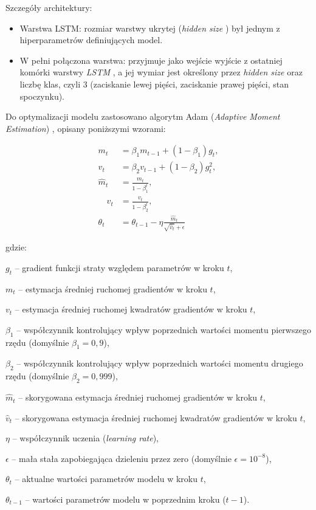 \documentclass[eeg_v4.tex]{subfiles}
\begin{document}
    Szczegóły architektury:
    \begin{itemize}
        \item Warstwa LSTM: rozmiar warstwy ukrytej (\textit{hidden size}
        ) był jednym z hiperparametrów definiujących model.
        \item W pełni połączona warstwa: przyjmuje jako wejście wyjście z ostatniej komórki warstwy \textit{LSTM}
        , a jej wymiar jest określony przez \textit{hidden size}
        oraz liczbę klas, czyli 3 (zaciskanie lewej pięści, zaciskanie prawej pięści, stan spoczynku).
    \end{itemize}

    Do optymalizacji modelu zastosowano algorytm Adam (\textit{Adaptive Moment Estimation}) \cite{pytorch2025adam}
    , opisany poniższymi wzorami:

    \[
        \begin{align*}
            m_t &= \beta_1 m_{t-1} + (1 - \beta_1) g_t, \\
            v_t &= \beta_2 v_{t-1} + (1 - \beta_2) g_t^2, \\
            \hat{m}_t &= \frac{m_t}{1 - \beta_1^t}, \\
            \quad \hat{v}_t &= \frac{v_t}{1 - \beta_2^t}, \\
            \theta_t &= \theta_{t-1} - \eta \frac{\hat{m}_t}{\sqrt{\hat{v}_t} + \epsilon}
        \end{align*}
    \]

    gdzie:

    \begin{description}
        \item \( g_t \) – gradient funkcji straty względem parametrów w kroku \( t \),
        \item \( m_t \) – estymacja średniej ruchomej gradientów w kroku \( t \),
        \item \( v_t \) – estymacja średniej ruchomej kwadratów gradientów w kroku \( t \),
        \item \( \beta_1 \) – współczynnik kontrolujący wpływ poprzednich wartości momentu pierwszego rzędu (domyślnie
        \( \beta_1 = 0{,}9 \)),
        \item \( \beta_2 \) – współczynnik kontrolujący wpływ poprzednich wartości momentu drugiego rzędu (domyślnie
        \( \beta_2 = 0{,}999 \)),
        \item \( \hat{m}_t \) – skorygowana estymacja średniej ruchomej gradientów w kroku \( t \),
        \item \( \hat{v}_t \) – skorygowana estymacja średniej ruchomej kwadratów gradientów w kroku \( t \),
        \item \( \eta \) – współczynnik uczenia (\textit{learning rate}),
        \item \( \epsilon \) – mała stała zapobiegająca dzieleniu przez zero (domyślnie \( \epsilon = 10^{-8} \)),
        \item \( \theta_t \) – aktualne wartości parametrów modelu w kroku \( t \),
        \item \( \theta_{t-1} \) – wartości parametrów modelu w poprzednim kroku (\( t-1 \)).
    \end{description}
\end{document}
